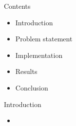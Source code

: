 \documentclass[t,11pt]{beamer}
\title{}
\subtitle{}
\date{\now}
\author{Leon Helwerda, Tim van der Meij}
\begin{document}
{
\begin{frame}[plain]
  \maketitle
\end{frame}
\addtocounter{framenumber}{-1}}

\toggleslidecolors

\begin{frame}[fragile]{Contents}
\begin{itemize}
  \item Introduction
  \item Problem statement
  \item Implementation
  \item Results
  \item Conclusion
\end{itemize}
\end{frame}

\begin{frame}[fragile]{Introduction}
\begin{itemize}
  \item
\end{itemize}
\end{frame}
\end{document}
